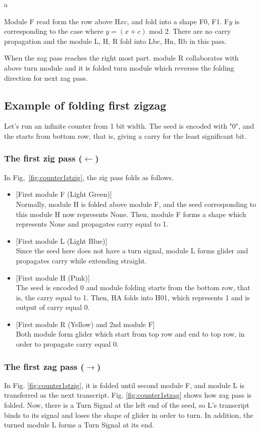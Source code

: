 \documentclass[runningheads]{llncs}
\begin{document}
a


Module F read form the row above H$xc$, and fold into a shape F0, F1.
F$y$ is corresponding to the case where $y = (x + c)$ mod $2$.
There are no carry propagation and the module L, H, R fold into Lbc, Hn, Rb in this pass.

When the zag pass reaches the right most part. module R collaborates with above turn module and it is folded turn module which reverses the folding direction for next zag pass.

\subsection{Example of folding first zigzag}
Let's run an infinite counter from 1 bit width.
The seed is encoded with "0", and the starts from bottom row, that is, giving a carry for the least significant bit.

\subsubsection{The first zig pass ($\leftarrow$)}
In Fig,~\ref{fig:counter1stzig}, the zig pass folds as follows.
\begin{itemize}
\item{[First module F (Light Green)]} \\Normally, module H is folded above module F, and the seed corresponding to this module H now represents None.
Then, module F forms a shape which represents None and propagates carry equal to 1.
\item{[First module L (Light Blue)]} \\Since the seed here does not have a turn signal, module L forms glider and propagates carry while extending straight.

\item{[First module H (Pink)]} \\The seed is encoded 0 and module folding starts from the bottom row, that is, the carry equal to 1.
Then, HA folds into H01, which represents 1 and is output of carry equal 0.

\item{[First module R (Yellow) and 2nd module F]} \\Both module form glider which start from top row and end to top row, in order to propagate carry equal 0.

\end{itemize}

\subsubsection{The first zag pass ($\rightarrow$)}
In Fig. \ref{fig:counter1stzig}, it is folded until second module F, and module L is transferred as the next transcript.
Fig. \ref{fig:counter1stzag} shows how zag pass is folded.
Now, there is a Turn Signal at the left end of the seed, so L's transcript binds to its signal and loses the shape of glider in order to turn.
In addition, the turned module L forms a Turn Signal at its end.
\end{document}
